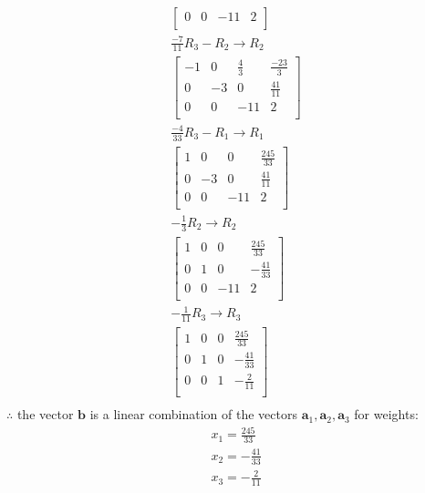 \documentclass[12pt letter]{report}
\begin{document}
{\begin{align*}
\begin{bmatrix}
      0  & 0 & -11         & 2             \\
    \end{bmatrix}
    \\
    \frac{-7}{11}R_3 - R_2  \rightarrow R_2 \\
    \begin{bmatrix}
      -1 & 0  & \frac{4}{3} & \frac{-23}{3} \\
      0  & -3 & 0           & \frac{41}{11} \\
      0  & 0  & -11         & 2             \\
    \end{bmatrix}
    \\
    \frac{-4}{33}R_3 - R_1  \rightarrow R_1 \\
    \begin{bmatrix}
      1 & 0  & 0   & \frac{245}{33} \\
      0 & -3 & 0   & \frac{41}{11}  \\
      0 & 0  & -11 & 2              \\
    \end{bmatrix}
    \\
    -\frac{1}{3}R_2 \to R_2                 \\
    \begin{bmatrix}
      1 & 0 & 0   & \frac{245}{33} \\
      0 & 1 & 0   & -\frac{41}{33} \\
      0 & 0 & -11 & 2              \\
    \end{bmatrix}            \\
    -\frac{1}{11} R_3 \to R_3               \\
    \begin{bmatrix}
      1 & 0 & 0 & \frac{245}{33} \\
      0 & 1 & 0 & -\frac{41}{33} \\
      0 & 0 & 1 & -\frac{2}{11}  \\
    \end{bmatrix}              \\
  \end{align*}
  $\therefore$ the vector $\mathbf{b}$ is a linear combination of the vectors $\mathbf{a}_1, \mathbf{a}_2, \mathbf{a}_3$ for
  weights:
  \begin{align*}
    x_1 = \frac{245}{33} \\
    x_2 = -\frac{41}{33} \\
    x_3 = -\frac{2}{11}  \\
  \end{align*}

}
\end{document}
